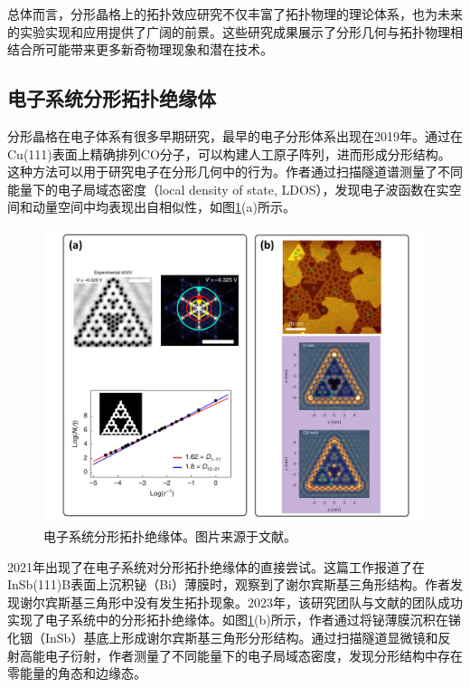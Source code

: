 总体而言，分形晶格上的拓扑效应研究不仅丰富了拓扑物理的理论体系，也为未来的实验实现和应用提供了广阔的前景。这些研究成果展示了分形几何与拓扑物理相结合所可能带来更多新奇物理现象和潜在技术。

\subsection{电子系统分形拓扑绝缘体}
分形晶格在电子体系有很多早期研究，最早的电子分形体系出现在2019年\cite{kempkes2019design}。通过在Cu(111)表面上精确排列CO分子，可以构建人工原子阵列，进而形成分形结构。这种方法可以用于研究电子在分形几何中的行为。作者通过扫描隧道谱测量了不同能量下的电子局域态密度（local density of state, LDOS），发现电子波函数在实空间和动量空间中均表现出自相似性，如图\ref{fig:ElecFractal}(a)所示。
\begin{figure}[htbp]
    \centering
    \includegraphics[width=0.75\linewidth]{figure/FractalTopo/ElecFractal.jpg}
    \caption{电子系统分形拓扑绝缘体。图片来源于文献\cite{kempkes2019design,kempkes2019design}。}
    \label{fig:ElecFractal}
\end{figure}
2021年出现了在电子系统对分形拓扑绝缘体的直接尝试\cite{liu2021sierpinski}。这篇工作报道了在InSb(111)B表面上沉积铋（Bi）薄膜时，观察到了谢尔宾斯基三角形结构。作者发现谢尔宾斯基三角形中没有发生拓扑现象。2023年，该研究团队与文献\cite{kempkes2019design}的团队成功实现了电子系统中的分形拓扑绝缘体。如图\ref{fig:ElecFractal}(b)所示，作者通过将铋薄膜沉积在锑化铟（InSb）基底上形成谢尔宾斯基三角形分形结构。通过扫描隧道显微镜和反射高能电子衍射，作者测量了不同能量下的电子局域态密度，发现分形结构中存在零能量的角态和边缘态。

